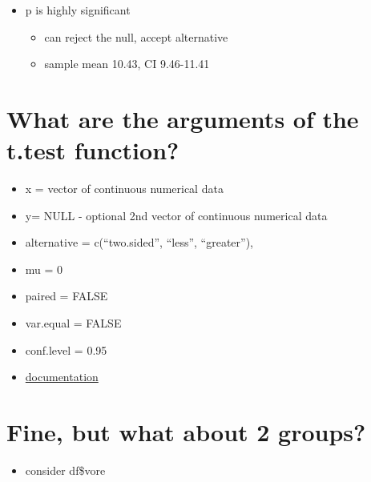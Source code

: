 \documentclass[
]{book}
\newenvironment{Shaded}{\begin{snugshade}}{\end{snugshade}}
\newcommand{\KeywordTok}[1]{\textcolor[rgb]{0.13,0.29,0.53}{\textbf{#1}}}
\newcommand{\NormalTok}[1]{#1}
\newcommand{\OperatorTok}[1]{\textcolor[rgb]{0.81,0.36,0.00}{\textbf{#1}}}
\providecommand{\tightlist}{%
  \setlength{\itemsep}{0pt}\setlength{\parskip}{0pt}}
\begin{document}
\begin{itemize}
\tightlist
\item
  p is highly significant

  \begin{itemize}
  \tightlist
  \item
    can reject the null, accept alternative
  \item
    sample mean 10.43, CI 9.46-11.41
  \end{itemize}
\end{itemize}

\hypertarget{what-are-the-arguments-of-the-t.test-function}{%
\section{What are the arguments of the t.test function?}\label{what-are-the-arguments-of-the-t.test-function}}

\begin{itemize}
\tightlist
\item
  x = vector of continuous numerical data
\item
  y= NULL - optional 2nd vector of continuous numerical data
\item
  alternative = c(``two.sided'', ``less'', ``greater''),
\item
  mu = 0
\item
  paired = FALSE
\item
  var.equal = FALSE
\item
  conf.level = 0.95
\item
  \href{https://www.rdocumentation.org/packages/stats/versions/3.5.1/topics/t.test}{documentation}
\end{itemize}

\hypertarget{fine-but-what-about-2-groups}{%
\section{Fine, but what about 2 groups?}\label{fine-but-what-about-2-groups}}

\begin{itemize}
\tightlist
\item
  consider df\$vore
\end{itemize}

\begin{Shaded}
\end{Shaded}
\end{document}
